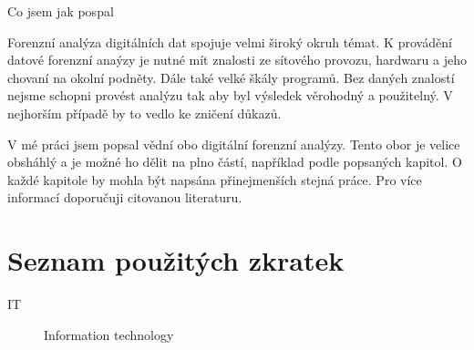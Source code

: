 \documentclass[thesis=B,czech]{FITthesis}[2012/06/26]
\begin{document}
\begin{conclusion}
Co jsem jak pospal

Forenzní analýza digitálních dat spojuje velmi široký okruh témat. K provádění datové forenzní anaýzy je nutné mít znalosti ze sítového provozu, hardwaru a jeho chovaní na okolní podněty. Dále také velké škály programů. Bez daných znalostí nejsme schopni provést analýzu tak aby byl výsledek věrohodný a použitelný. V nejhorším případě by to vedlo ke zničení důkazů. 

V mé práci jsem popsal vědní obo digitální forenzní analýzy. Tento obor je velice obsháhlý a je možné ho dělit na plno částí, například podle popsaných kapitol. O každé kapitole by mohla být napsána přinejmenších stejná práce. Pro více informací doporučuji citovanou literaturu.






\end{conclusion}




\appendix

\chapter{Seznam použitých zkratek}
\begin{description}

    \item[IT] Information technology


\end{description}
\end{document}
